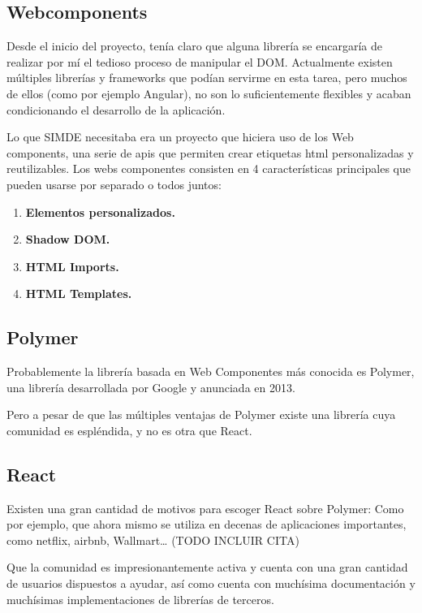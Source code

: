 \subsection{Webcomponents}

Desde el inicio del proyecto, tenía claro que alguna librería se encargaría de realizar 
por mí el tedioso proceso de manipular el DOM. Actualmente existen múltiples librerías 
y frameworks que podían servirme en esta tarea, pero muchos de ellos (como por ejemplo Angular),
 no son lo suficientemente flexibles y acaban condicionando el desarrollo de la aplicación.

\bigskip
Lo que SIMDE necesitaba era un proyecto que hiciera uso de los Web components, 
una serie de apis que permiten crear etiquetas html personalizadas y reutilizables. 
Los webs componentes consisten en 4 características principales que pueden usarse 
por separado o todos juntos:

\begin{enumerate}

\item \textbf{Elementos personalizados.}
\item \textbf{Shadow DOM.}
\item \textbf{HTML Imports.}
\item \textbf{HTML Templates.}

\end{enumerate}

\subsection{Polymer}
Probablemente la librería basada en Web Componentes más conocida es Polymer,
una librería desarrollada por Google y anunciada en 2013. 

\bigskip

Pero a pesar de que las múltiples ventajas de Polymer existe una librería cuya comunidad es espléndida,
 y no es otra que React.

\subsection{React}
Existen una gran cantidad de motivos para escoger React sobre Polymer: Como por ejemplo, 
que ahora mismo se utiliza en decenas de aplicaciones importantes, como netflix, airbnb, Wallmart… (TODO INCLUIR CITA)

\bigskip
Que la comunidad es impresionantemente activa y cuenta con una gran cantidad de usuarios dispuestos a ayudar, así como cuenta con muchísima documentación y muchísimas implementaciones de librerías de terceros.

